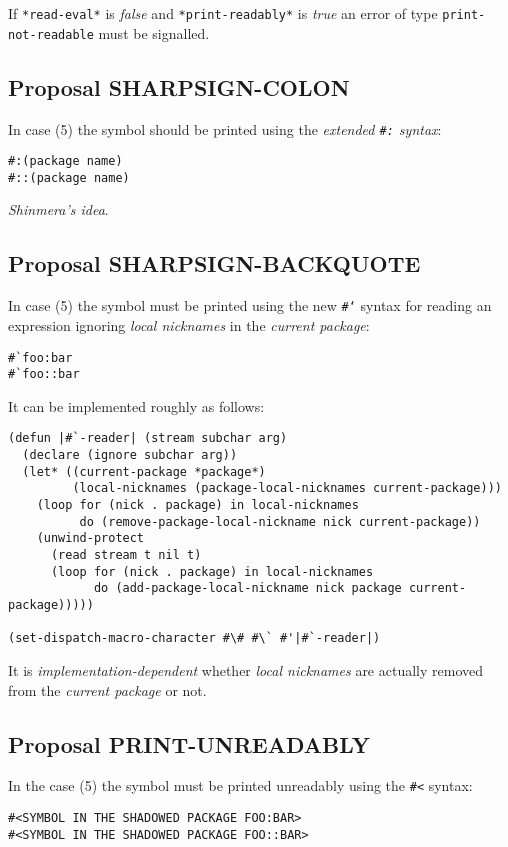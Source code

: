 \documentclass[11pt]{article}
\begin{document}
If \texttt{*read-eval*} is \emph{false} and \texttt{*print-readably*} is \emph{true} an error of type
\texttt{print-not-readable} must be signalled.
\subsection{Proposal SHARPSIGN-COLON}
\label{sec:orga0d7203}
In case (5) the symbol should be printed using the \emph{extended \texttt{\#:} syntax}:
\begin{verbatim}
#:(package name)
#::(package name)
\end{verbatim}

\emph{Shinmera's idea}.
\subsection{Proposal SHARPSIGN-BACKQUOTE}
\label{sec:org56d2363}
In case (5) the symbol must be printed using the new \texttt{\#`} syntax for reading an
expression ignoring \emph{local nicknames} in the \emph{current package}:
\begin{verbatim}
#`foo:bar
#`foo::bar
\end{verbatim}

It can be implemented roughly as follows:
\begin{verbatim}
(defun |#`-reader| (stream subchar arg)
  (declare (ignore subchar arg))
  (let* ((current-package *package*)
         (local-nicknames (package-local-nicknames current-package)))
    (loop for (nick . package) in local-nicknames
          do (remove-package-local-nickname nick current-package))
    (unwind-protect
      (read stream t nil t)
      (loop for (nick . package) in local-nicknames
            do (add-package-local-nickname nick package current-package)))))

(set-dispatch-macro-character #\# #\` #'|#`-reader|)
\end{verbatim}
It is \emph{implementation-dependent} whether \emph{local nicknames} are actually removed
from the \emph{current package} or not.
\subsection{Proposal PRINT-UNREADABLY}
\label{sec:org04c39f5}
In the case (5) the symbol must be printed unreadably using the \texttt{\#<} syntax:
\begin{verbatim}
#<SYMBOL IN THE SHADOWED PACKAGE FOO:BAR>
#<SYMBOL IN THE SHADOWED PACKAGE FOO::BAR>
\end{verbatim}
\end{document}
